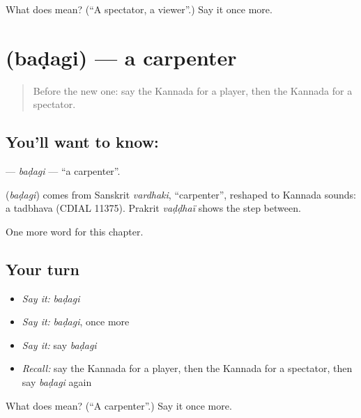 \begin{tcolorbox}[breakable,colback=teal!4,colframe=teal!35!black,title={Before you move on}]
What does  mean? (\textquotedblleft{}A spectator, a viewer\textquotedblright{}.) Say it once more.
\end{tcolorbox}
\section[\texorpdfstring{\kn{ಬಡಗಿ} (baḍagi)}{ಬಡಗಿ (baḍagi)}]{ (baḍagi) — a carpenter}

\label{lesson:KA-C196-badagi}



\begin{quote}
Before the new one: say the Kannada for a player, then the Kannada for a spectator.
\end{quote}

\subsection*{You'll want to know: }
\textbf{} — \emph{baḍagi} — \textquotedblleft{}a carpenter\textquotedblright{}.

\begin{cousinweb}
\textbf{} (\emph{baḍagi}) comes from Sanskrit \emph{vardhaki}, \textquotedblleft{}carpenter\textquotedblright{}, reshaped to Kannada sounds: a tadbhava (CDIAL 11375). Prakrit \emph{vaḍḍhaï} shows the step between.
\end{cousinweb}

\begin{grammarlens}[title={What you've built}]
One more word for this chapter.
\end{grammarlens}

\subsection*{Your turn}
\begin{itemize}
\raggedright
  \item \emph{Say it:} \emph{baḍagi}
  \item \emph{Say it:} \emph{baḍagi}, once more
  \item \emph{Say it:} say \emph{baḍagi}
  \item \emph{Recall:} say the Kannada for a player, then the Kannada for a spectator, then say \emph{baḍagi} again
\end{itemize}

\begin{tcolorbox}[breakable,colback=teal!4,colframe=teal!35!black,title={Before you move on}]
What does  mean? (\textquotedblleft{}A carpenter\textquotedblright{}.) Say it once more.
\end{tcolorbox}
